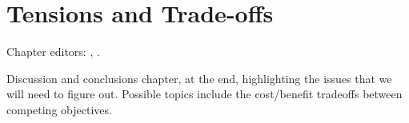 \chapter[Tensions and Trade-offs]{Tensions and Trade-offs}
\def\chpname{tradeoffs}\label{chp:\chpname}

Chapter editors:
,
.

Discussion and conclusions chapter, at the end, highlighting the
issues that we will need to figure out. Possible topics include the
cost/benefit tradeoffs between competing objectives.
